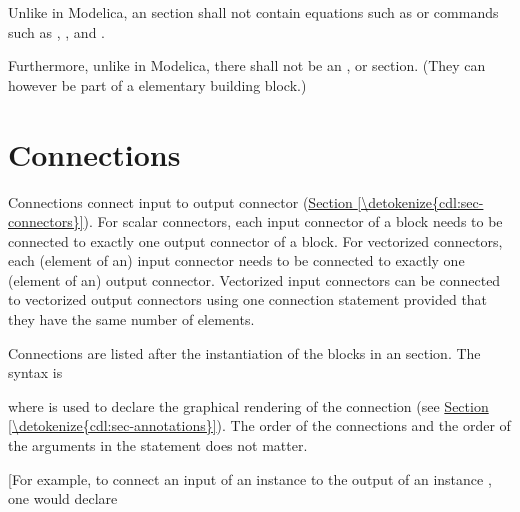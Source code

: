 \documentclass[letterpaper,10pt, openany,english]{sphinxmanual}
\begin{document}
Unlike in Modelica, an  section shall not contain
equations such as  or commands such as , ,
 and .

Furthermore, unlike in Modelica, there shall not be an ,
 or 
section. (They can however be part of a elementary building block.)


\section{Connections}
\label{\detokenize{cdl:connections}}\label{\detokenize{cdl:sec-connections}}
Connections connect input to output connector (\hyperref[\detokenize{cdl:sec-connectors}]{Section \ref{\detokenize{cdl:sec-connectors}}}).
For scalar connectors, each input connector of a block needs to be connected to exactly
one output connector of a block.
For vectorized connectors, each (element of an) input connector needs to be connected
to exactly one (element of an) output connector.
Vectorized input connectors can be connected to vectorized output connectors
using one connection statement provided that
they have the same number of elements.

Connections are listed after the instantiation of the blocks in an 
section. The syntax is

\begin{sphinxVerbatim}[commandchars=\\\{\}]
  
\end{sphinxVerbatim}

where  is used to declare
the graphical rendering of the connection (see \hyperref[\detokenize{cdl:sec-annotations}]{Section \ref{\detokenize{cdl:sec-annotations}}}).
The order of the connections and the order of the arguments in the
 statement does not matter.

{[}For example, to connect an input  of an instance  to the output
 of an instance , one would declare
\end{document}
